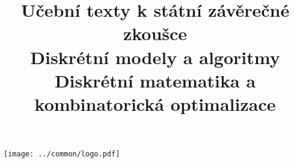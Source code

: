 \clearpage

\clearpage

\title{\LARGE Učební texty k státní závěrečné zkoušce \\ Diskrétní modely a algoritmy \\ Diskrétní matematika a kombinatorická optimalizace}




\maketitle

\vspace{10mm}
\begin{center}
\texttt{[image: ../common/logo.pdf]}
\end{center} 

\clearpage

\clearpage

\tableofcontents







